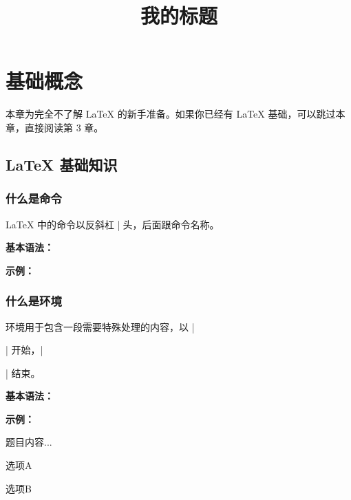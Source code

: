 
\section{基础概念}

本章为完全不了解 \LaTeX{} 的新手准备。如果你已经有 \LaTeX{} 基础，可以跳过本章，直接阅读第 3 章。

\subsection{LaTeX 基础知识}

\subsubsection{什么是命令}

\LaTeX{} 中的命令以反斜杠 |\| 开头，后面跟命令名称。

\textbf{基本语法：}
\begin{latexcode}
\end{latexcode}

\textbf{示例：}
\begin{latexcode}
  \title{我的标题}           %
  \fillin[答案]              %
  \maketitle                 %
\end{latexcode}

\subsubsection{什么是环境}

环境用于包含一段需要特殊处理的内容，以 |\begin{环境名}| 开始，|\end{环境名}| 结束。

\textbf{基本语法：}

\textbf{示例：}
\begin{latexcode}
  \begin{question}
    题目内容...
  \end{question}

  \begin{choices}
    \item 选项A
    \item 选项B
  \end{choices}
\end{latexcode}

